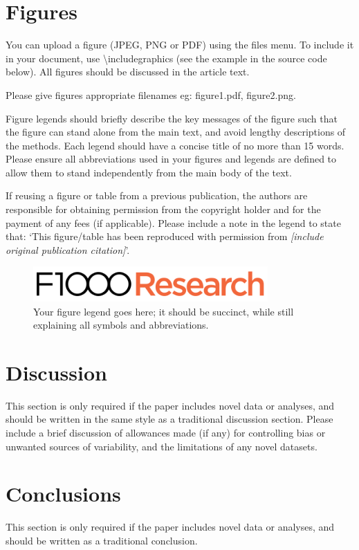 \documentclass[10pt,a4paper]{article}
\begin{document}
\section*{Figures}
You can upload a figure (JPEG, PNG or PDF) using the files menu. To include it in your document, use  \textbackslash includegraphics (see the example in the source code below). All figures should be discussed in the article text.

Please give figures appropriate filenames eg: figure1.pdf, figure2.png.

Figure legends should briefly describe the key messages of the figure such that the figure can stand alone from the main text, and avoid lengthy descriptions of the methods. Each legend should have a concise title of no more than 15 words. Please ensure all abbreviations used in your figures and legends are defined to allow them to stand independently from the main body of the text.

If reusing a figure or table from a previous publication, the authors are responsible for obtaining permission from the copyright holder and for the payment of any fees (if applicable). Please include a note in the legend to state that: ‘This figure/table has been reproduced with permission from \textit{[include original publication citation]}’.

\begin{figure}
	\centering
	\includegraphics[width=0.8\textwidth]{F1000header.png}
	\caption{\label{fig:your-figure}Your figure legend goes here; it should be succinct, while still explaining all symbols and abbreviations. }
\end{figure}

\section*{Discussion} %
This section is only required if the paper includes novel data or analyses, and should be written in the same style as a traditional discussion section.
Please include a brief discussion of allowances made (if any) for controlling bias or unwanted sources of variability, and the limitations of any novel datasets.


\section*{Conclusions} %
This section is only required if the paper includes novel data or analyses, and should be written as a traditional conclusion.
\end{document}
